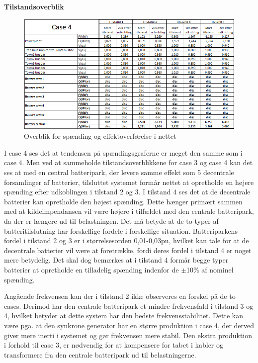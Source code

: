 \textbf{Tilstandsoverblik}
\begin{figure}[H] %
	\centering
	\includegraphics[width=1\textwidth]{figurer/LargeDisturbanceBatterypark/Overview}
	\caption{Overblik for spænding og effektoverførelse i nettet}
	\label{fig:C4Overview}
\end{figure}

I case 4 ses det at tendensen på spændingsgraferne er meget den samme som i case 4. Men ved at sammeholde tilstandsoverblikkene for case 3 og case 4 kan det ses at med en central batteripark, der levere samme effekt som 5 decentrale forsamlinger af batterier, tilsluttet systemet formår nettet at opretholde en højere spænding efter udkoblingen i tilstand 2 og 3. I tilstand 4 ses det at de decentrale batterier kan opretholde den højest spænding. Dette hænger primært sammen med at kildeimpendansen vil være højere i tilfældet med den centrale batteripark, da der er længere ud til belastningen. Det må betyde at de to typer af batteritilslutning har forskellige fordele i forskellige situation. Batteriparkens fordel i tilstand 2 og 3 er i størrelsesorden 0,01-0,03pu, hvilket kan tale for at de decentrale batterier vil være at foretrække, fordi deres fordel i tilstand 4 er noget mere betydelig. Det skal dog bemærkes at i tilstand 4 formår begge typer batterier at opretholde en tilladelig spænding indenfor de $\pm$10\% af nominel spænding.

Angående frekvensen kan der i tilstand 2 ikke observeres en forskel på de to cases. Derimod har den centrale batteripark et mindre frekvensfald i tilstand 3 og 4, hvilket betyder at dette system har den bedste frekvensstabilitet. Dette kan være pga. at den synkrone generator har en større produktion i case 4, der derved giver mere inerti i systemet og gør frekvensen mere stabil. Den ekstra produktion i forhold til case 3, er nødvendig for at kompensere for tabet i kabler og transformere fra den centrale batteripark ud til belastningerne.
